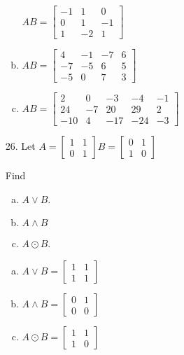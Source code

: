 \begin{itemize}
\begin{enumerate}[a.]
                  $AB = \begin{bmatrix}
                        -1 & 1  & 0  \\
                        0  & 1  & -1 \\
                        1  & -2 & 1
                     \end{bmatrix}$
            \item
                  $AB = \begin{bmatrix}
                        4  & -1 & -7 & 6 \\
                        -7 & -5 & 6  & 5 \\
                        -5 & 0  & 7  & 3
                     \end{bmatrix}$
            \item
                  $AB = \begin{bmatrix}
                        2   & 0  & -3  & -4  & -1 \\
                        24  & -7 & 20  & 29  & 2  \\
                        -10 & 4  & -17 & -24 & -3
                     \end{bmatrix}$ \vspace{3mm}
         \end{enumerate}
   \item[26.] Let $A = \begin{bmatrix} 1 & 1 \\ 0 & 1 \end{bmatrix} B = \begin{bmatrix} 0 & 1 \\ 1 & 0 \end{bmatrix}$

         Find
         \begin{enumerate}[a.]
            \item $A \lor B$.
            \item $A \land B$
            \item $A \odot B$.
         \end{enumerate}
         \answer
         \begin{enumerate}[a.]
            \item $A \lor B = \begin{bmatrix} 1 & 1 \\ 1 & 1 \end{bmatrix}$
            \item $A \land B = \begin{bmatrix} 0 & 1 \\ 0 & 0 \end{bmatrix}$
            \item $A \odot B = \begin{bmatrix} 1 & 1 \\ 1 & 0 \end{bmatrix}$
         \end{enumerate}
\end{itemize}